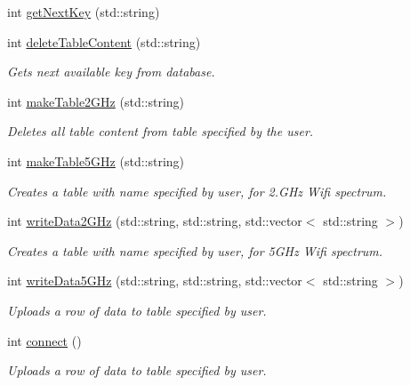 \begin{DoxyCompactItemize}
\item 
int \mbox{\hyperlink{classDatabaseConnect_a09195941dbccc3a9ae41edc9440f0513}{get\+Next\+Key}} (std\+::string)
\item 
int \mbox{\hyperlink{classDatabaseConnect_a252260a2134ff437ce2b84480a5632a0}{delete\+Table\+Content}} (std\+::string)
\begin{DoxyCompactList}\small\item\em Gets next available key from database. \end{DoxyCompactList}\item 
int \mbox{\hyperlink{classDatabaseConnect_aa0e8c669029e97ca8588c4bcddf7735e}{make\+Table2\+G\+Hz}} (std\+::string)
\begin{DoxyCompactList}\small\item\em Deletes all table content from table specified by the user. \end{DoxyCompactList}\item 
int \mbox{\hyperlink{classDatabaseConnect_add4b088d6e5d4be6cbad6c1f0226be39}{make\+Table5\+G\+Hz}} (std\+::string)
\begin{DoxyCompactList}\small\item\em Creates a table with name specified by user, for 2.\+G\+Hz Wifi spectrum. \end{DoxyCompactList}\item 
int \mbox{\hyperlink{classDatabaseConnect_aa2fe852f7eaaa78f4172bde21fe65c4b}{write\+Data2\+G\+Hz}} (std\+::string, std\+::string, std\+::vector$<$ std\+::string $>$)
\begin{DoxyCompactList}\small\item\em Creates a table with name specified by user, for 5G\+Hz Wifi spectrum. \end{DoxyCompactList}\item 
int \mbox{\hyperlink{classDatabaseConnect_a4572abf2e9cc464dbdccd403c1ae4b08}{write\+Data5\+G\+Hz}} (std\+::string, std\+::string, std\+::vector$<$ std\+::string $>$)
\begin{DoxyCompactList}\small\item\em Uploads a row of data to table specified by user. \end{DoxyCompactList}\item 
int \mbox{\hyperlink{classDatabaseConnect_a9e0c28f4d98a60273eecaac77a596878}{connect}} ()
\begin{DoxyCompactList}\small\item\em Uploads a row of data to table specified by user. \end{DoxyCompactList}\item 

\end{DoxyCompactItemize}
